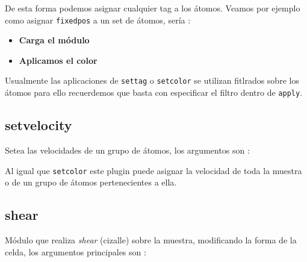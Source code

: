 
De esta forma podemos asignar cualquier tag a los \'atomos. Veamos por ejemplo como asignar \verb|fixedpos| a un set de \'atomos, ser\'ia :

\begin{itemize}
 \item \textbf{Carga el m\'odulo}
 \item \textbf{Aplicamos el color}
\end{itemize}

Usualmente las aplicaciones de \verb|settag| o \verb|setcolor| se utilizan fitlrados sobre los \'atomos para ello recuerdemos que basta con especificar el filtro dentro de \verb|apply|.

\subsection{setvelocity}
Setea las velocidades de un grupo de \'atomos, los argumentos son :


Al igual que \verb|setcolor| este plugin puede asignar la velocidad de toda la muestra o de un grupo de \'atomos pertenecientes a ella.

\subsection{shear}
M\'odulo que realiza \textit{shear} (cizalle) sobre la muestra, modificando la forma de la celda, los argumentos principales son :


